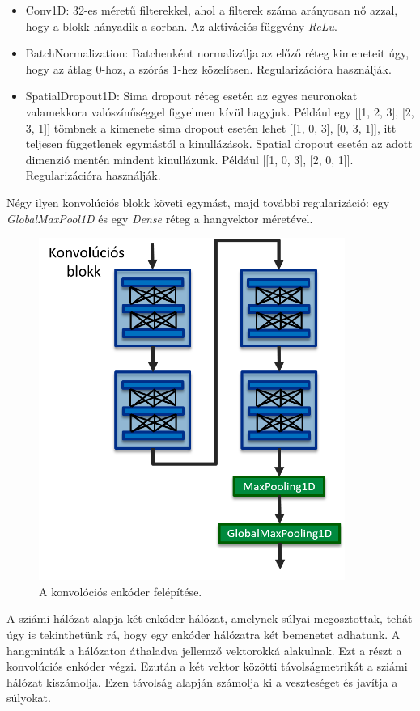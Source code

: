 \begin{itemize}
	\item Conv1D: 32-es méretű filterekkel, ahol a filterek száma arányosan nő azzal, hogy a blokk hányadik a sorban. Az aktivációs függvény \emph{ReLu}.
	\item BatchNormalization: Batchenként normalizálja az előző réteg kimeneteit úgy, hogy az átlag 0-hoz, a szórás 1-hez közelítsen. Regularizációra használják.
	\item SpatialDropout1D: Sima dropout réteg esetén az egyes neuronokat valamekkora valószínűséggel figyelmen kívül hagyjuk. Például egy [[1, 2, 3], [2, 3, 1]] tömbnek a kimenete sima dropout esetén lehet [[1, 0, 3], [0, 3, 1]], itt teljesen függetlenek egymástól a kinullázások. Spatial dropout esetén az adott dimenzió mentén mindent kinullázunk. Például [[1, 0, 3], [2, 0, 1]]. Regularizációra használják.
\end{itemize}

Négy ilyen konvolúciós blokk követi egymást, majd további regularizáció: egy \emph{GlobalMaxPool1D} és egy \emph{Dense} réteg a hangvektor méretével.

\begin{figure}[!ht]
	\centering
	\includegraphics[width=100mm, keepaspectratio]{figures/conv_encoder.png}
	\caption{A konvolóciós enkóder felépítése.}
	\label{fig:conv_encoder}
\end{figure}

A sziámi hálózat alapja két enkóder hálózat, amelynek súlyai megosztottak, tehát úgy is tekinthetünk rá, hogy egy enkóder hálózatra két bemenetet adhatunk. A hangminták a hálózaton áthaladva jellemző vektorokká alakulnak. Ezt a részt a konvolúciós enkóder végzi. Ezután a két vektor közötti távolságmetrikát a sziámi hálózat kiszámolja. Ezen távolság alapján számolja ki a veszteséget és javítja a súlyokat.

